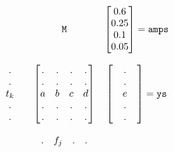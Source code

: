 
%

\[ 
\begin{matrix}
& {\large \mathtt{M}} &
 \begin{bmatrix} 
0.6 \\
0.25 \\
0.1 \\
0.05 \\
\end{bmatrix}
= \mathtt{amps}
\\
\\
\begin{matrix} 
&.& \\
&.& \\
&t_k& \\
&.& \\
&.& \\
\end{matrix}
&
\begin{bmatrix} 
. & . & . & . \\
. & . & . & . \\
a & b & c & d \\
. & . & . & . \\
. & . & . & . \\
\end{bmatrix} 
&
\begin{bmatrix} 
&.& \\
&.& \\
&e& \\
&.& \\
&.& \\
\end{bmatrix} = \mathtt{ys}
\\
\\
&
\begin{matrix}
. & f_j & . & . \\
\end{matrix}
&
\\
\end{matrix}
\]


 
